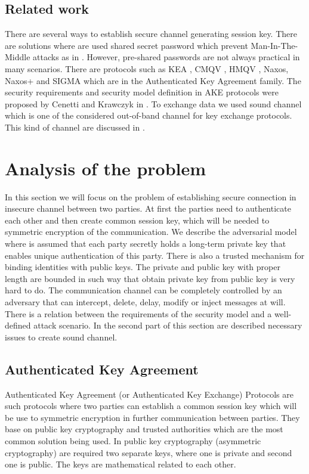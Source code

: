 \documentclass[11pt,titlepage]{article}
\theoremstyle{plain}
\begin{document}
\subsection{Related work}
There are several ways to establish secure channel generating session key.
There are solutions where are used shared secret password which prevent Man-In-The-Middle attacks as in \cite{EKE, EKE2}. However, pre-shared passwords are not always practical in many scenarios. There are protocols such as KEA \cite{KEA}, CMQV \cite{CMQV}, HMQV \cite{HMQV}, Naxos, Naxos+ \cite{NAXOS} and SIGMA \cite{sign_mac} which are in the Authenticated Key Agreement family. The security requirements and security model definition in AKE protocols were proposed by Cenetti and Krawczyk in \cite{security_canetti_krawczyk, key_exchange}. To exchange data we used sound channel which is one of the considered out-of-band channel for key exchange protocols. This kind of channel are discussed in \cite{chirp, sib, ad_hoc, veh, vibrat, audio_modem}.

\section{Analysis of the problem}

In this section we will focus on the problem of establishing secure connection in insecure channel between two parties. At first the parties need to authenticate each other and then create common session key, which will be needed to symmetric encryption of the communication. We describe the adversarial model where is assumed that each party secretly holds a long-term private key that enables unique authentication of this party. There is also a trusted mechanism for binding identities with public keys. The private and public key with proper length are bounded in such way that obtain private key from public key is very hard to do. The communication channel can be completely controlled by an adversary that can intercept, delete, delay, modify or inject messages at will. There is a relation between the requirements of the security model and a well-defined attack scenario. In the second part of this section are described necessary issues to create sound channel.

\subsection{Authenticated Key Agreement}
Authenticated Key Agreement (or Authenticated Key Exchange) Protocols are such protocols where two parties can establish a common session key which will be use to symmetric encryption in further communication between parties. They base on public key cryptography and trusted authorities which are the most common solution being used. In public key cryptography (asymmetric cryptography) are required two separate keys, where one is private and second one is public. The keys are mathematical related to each other.
\end{document}
